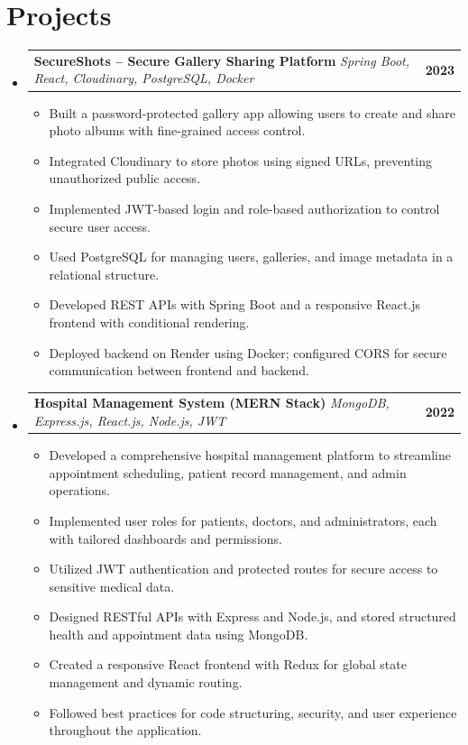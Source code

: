 \documentclass[letterpaper,11pt]{article}
\makeatletter
\newcommand{\resumeItem}[1]{
  \item\small{
    {#1 \vspace{-2pt}}
  }
}
\newcommand{\resumeProjectHeading}[2]{
    \item
    \begin{tabular*}{1.0\textwidth}[t]{l@{\extracolsep{\fill}}r}
      \small#1 & \textbf{\small #2} \\
    \end{tabular*}\vspace{-7pt}
}
\newcommand{\resumeItemListStart}{\begin{itemize}[leftmargin=0.15in, label={}]}
\newcommand{\resumeItemListEnd}{\end{itemize}\vspace{-5pt}}
\makeatother
\begin{document}
\section{Projects}
\resumeItemListStart

  \resumeProjectHeading
  {\textbf{SecureShots – Secure Gallery Sharing Platform} \hfill \emph{Spring Boot, React, Cloudinary, PostgreSQL, Docker}}{2023}
\resumeItemListStart
  \resumeItem{Built a password-protected gallery app allowing users to create and share photo albums with fine-grained access control.}
  \resumeItem{Integrated Cloudinary to store photos using signed URLs, preventing unauthorized public access.}
  \resumeItem{Implemented JWT-based login and role-based authorization to control secure user access.}
  \resumeItem{Used PostgreSQL for managing users, galleries, and image metadata in a relational structure.}
  \resumeItem{Developed REST APIs with Spring Boot and a responsive React.js frontend with conditional rendering.}
  \resumeItem{Deployed backend on Render using Docker; configured CORS for secure communication between frontend and backend.}
\resumeItemListEnd


  \resumeProjectHeading
    {\textbf{Hospital Management System (MERN Stack)} \hfill \emph{MongoDB, Express.js, React.js, Node.js, JWT}}{2022}
    \resumeItemListStart
      \resumeItem{Developed a comprehensive hospital management platform to streamline appointment scheduling, patient record management, and admin operations.}
      \resumeItem{Implemented user roles for patients, doctors, and administrators, each with tailored dashboards and permissions.}
      \resumeItem{Utilized JWT authentication and protected routes for secure access to sensitive medical data.}
      \resumeItem{Designed RESTful APIs with Express and Node.js, and stored structured health and appointment data using MongoDB.}
      \resumeItem{Created a responsive React frontend with Redux for global state management and dynamic routing.}
      \resumeItem{Followed best practices for code structuring, security, and user experience throughout the application.}
    \resumeItemListEnd

\resumeItemListEnd




\end{document}

